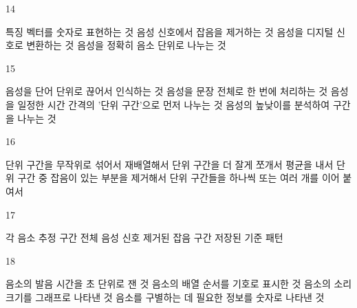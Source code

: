 \documentclass[fs9,seriesRus]{korfarm-base}
\begin{document}
\begin{kfSentenceUnit}{14}{}
\begin{kfChoices}
\kfChoice 특징 벡터를 숫자로 표현하는 것
\kfChoice 음성 신호에서 잡음을 제거하는 것
\kfChoice 음성을 디지털 신호로 변환하는 것
\kfChoice 음성을 정확히 음소 단위로 나누는 것
\end{kfChoices}
\end{kfSentenceUnit}

\begin{kfSentenceUnit}{15}{}
\begin{kfChoices}
\kfChoice 음성을 단어 단위로 끊어서 인식하는 것
\kfChoice 음성을 문장 전체로 한 번에 처리하는 것
\kfChoice 음성을 일정한 시간 간격의 '단위 구간'으로 먼저 나누는 것
\kfChoice 음성의 높낮이를 분석하여 구간을 나누는 것
\end{kfChoices}
\end{kfSentenceUnit}

\begin{kfSentenceUnit}{16}{}
\begin{kfChoices}
\kfChoice 단위 구간을 무작위로 섞어서 재배열해서
\kfChoice 단위 구간을 더 잘게 쪼개서 평균을 내서
\kfChoice 단위 구간 중 잡음이 있는 부분을 제거해서
\kfChoice 단위 구간들을 하나씩 또는 여러 개를 이어 붙여서
\end{kfChoices}
\end{kfSentenceUnit}

\begin{kfSentenceUnit}{17}{}
\begin{kfChoices}
\kfChoice 각 음소 추정 구간
\kfChoice 전체 음성 신호
\kfChoice 제거된 잡음 구간
\kfChoice 저장된 기준 패턴
\end{kfChoices}
\end{kfSentenceUnit}

\begin{kfSentenceUnit}{18}{}
\begin{kfChoices}
\kfChoice 음소의 발음 시간을 초 단위로 잰 것
\kfChoice 음소의 배열 순서를 기호로 표시한 것
\kfChoice 음소의 소리 크기를 그래프로 나타낸 것
\kfChoice 음소를 구별하는 데 필요한 정보를 숫자로 나타낸 것
\end{kfChoices}
\end{kfSentenceUnit}
\end{document}

